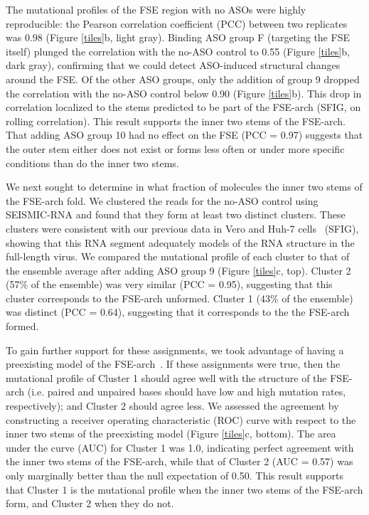 \documentclass[main.tex]{subfiles}
\begin{document}
The mutational profiles of the FSE region with no ASOs were highly reproducible: the Pearson correlation coefficient (PCC) between two replicates was 0.98 (Figure \ref{tiles}b, light gray).
Binding ASO group F (targeting the FSE itself) plunged the correlation with the no-ASO control to 0.55 (Figure \ref{tiles}b, dark gray), confirming that we could detect ASO-induced structural changes around the FSE.
Of the other ASO groups, only the addition of group 9 dropped the correlation with the no-ASO control below 0.90 (Figure \ref{tiles}b).
This drop in correlation localized to the stems predicted to be part of the FSE-arch (SFIG, on rolling correlation).
This result supports the inner two stems of the FSE-arch.
That adding ASO group 10 had no effect on the FSE (PCC = 0.97) suggests that the outer stem either does not exist or forms less often or under more specific conditions than do the inner two stems.

We next sought to determine in what fraction of molecules the inner two stems of the FSE-arch fold.
We clustered the reads for the no-ASO control using SEISMIC-RNA and found that they form at least two distinct clusters.
These clusters were consistent with our previous data in Vero and Huh-7 cells~\cite{Lan2022} (SFIG), showing that this RNA segment adequately models of the RNA structure in the full-length virus.
We compared the mutational profile of each cluster to that of the ensemble average after adding ASO group 9 (Figure \ref{tiles}c, top).
Cluster 2 (57\% of the ensemble) was very similar (PCC = 0.95), suggesting that this cluster corresponds to the FSE-arch unformed.
Cluster 1 (43\% of the ensemble) was distinct (PCC = 0.64), suggesting that it corresponds to the the FSE-arch formed.

To gain further support for these assignments, we took advantage of having a preexisting model of the FSE-arch~\cite{Ziv2020}.
If these assignments were true, then the mutational profile of Cluster 1 should agree well with the structure of the FSE-arch (i.e. paired and unpaired bases should have low and high mutation rates, respectively); and Cluster 2 should agree less.
We assessed the agreement by constructing a receiver operating characteristic (ROC) curve with respect to the inner two stems of the preexisting model (Figure \ref{tiles}c, bottom).
The area under the curve (AUC) for Cluster 1 was 1.0, indicating perfect agreement with the inner two stems of the FSE-arch, while that of Cluster 2 (AUC = 0.57) was only marginally better than the null expectation of 0.50.
This result supports that Cluster 1 is the mutational profile when the inner two stems of the FSE-arch form, and Cluster 2 when they do not.
\end{document}
